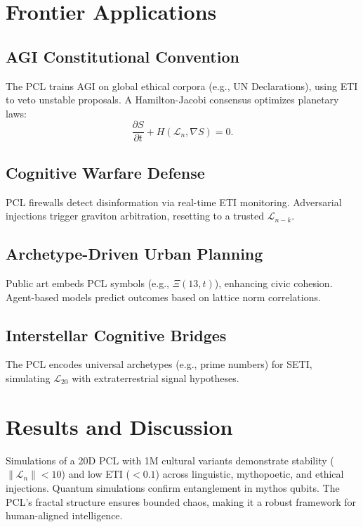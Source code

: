 \documentclass[11pt]{article}
\theoremstyle{plain}
\theoremstyle{definition}
\begin{document}
\section{Frontier Applications}
\subsection{AGI Constitutional Convention}
The PCL trains AGI on global ethical corpora (e.g., UN Declarations), using ETI to veto unstable proposals. A Hamilton-Jacobi consensus optimizes planetary laws:
\begin{equation}
\frac{\partial S}{\partial t} + H(\mathcal{L}_n, \nabla S) = 0.
\end{equation}

\subsection{Cognitive Warfare Defense}
PCL firewalls detect disinformation via real-time ETI monitoring. Adversarial injections trigger graviton arbitration, resetting to a trusted \( \mathcal{L}_{n-k} \).

\subsection{Archetype-Driven Urban Planning}
Public art embeds PCL symbols (e.g., \( \Xi(13, t) \)), enhancing civic cohesion. Agent-based models predict outcomes based on lattice norm correlations.

\subsection{Interstellar Cognitive Bridges}
The PCL encodes universal archetypes (e.g., prime numbers) for SETI, simulating \( \mathcal{L}_{20} \) with extraterrestrial signal hypotheses.

\section{Results and Discussion}
Simulations of a 20D PCL with 1M cultural variants demonstrate stability (\( \|\mathcal{L}_n\| < 10 \)) and low ETI (\( < 0.1 \)) across linguistic, mythopoetic, and ethical injections. Quantum simulations confirm entanglement in mythos qubits. The PCL's fractal structure ensures bounded chaos, making it a robust framework for human-aligned intelligence.
\end{document}
